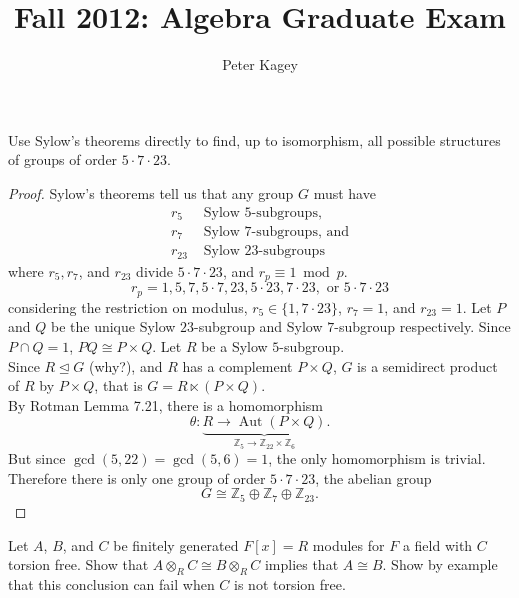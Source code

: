 \documentclass{article}
\newenvironment{problem}[2][Problem]{\begin{trivlist}
\item[\hskip \labelsep {\bfseries #1}\hskip \labelsep {\bfseries #2.}]}{\end{trivlist}}
\newcommand{\Z}{\mathbb Z}
\newcommand{\normalsubgroup}{\trianglelefteq}
\begin{document}
\title{Fall 2012: Algebra Graduate Exam}
\author{Peter Kagey}

\maketitle

\begin{problem}{1}
  Use Sylow's theorems directly to find, up to isomorphism, all possible structures of groups of order $5 \cdot 7 \cdot 23$.
\end{problem}

\begin{proof}
  Sylow's theorems tell us that any group $G$ must have \begin{align*}
    r_5 &\text{ Sylow } 5\text{-subgroups,} \\
    r_7 &\text{ Sylow } 7\text{-subgroups, and} \\
    r_{23} &\text{ Sylow } 23\text{-subgroups}
  \end{align*} where $r_5, r_7$, and $r_{23}$ divide $5 \cdot 7 \cdot 23$, and $r_p \equiv 1 \bmod p$. \[
    r_p = 1, 5, 7, 5 \cdot 7, 23, 5 \cdot 23, 7 \cdot 23, \text{ or } 5 \cdot 7 \cdot 23
  \] considering the restriction on modulus,
  $r_5 \in \{1, 7 \cdot 23\}$, $r_7 = 1$, and $r_{23} = 1$.
  Let $P$ and $Q$ be the unique Sylow $23$-subgroup and Sylow
  $7$-subgroup respectively.
  Since $P \cap Q = 1$, $PQ \cong P \times Q$. Let $R$ be a Sylow $5$-subgroup.
  \\
  Since $R \normalsubgroup G$ (why?), and $R$ has a complement $P \times Q$, $G$ is a
  semidirect product of $R$ by $P \times Q$, that is $G = R \ltimes (P \times Q)$.
  \\
  By Rotman Lemma 7.21, there is a homomorphism \[
    \theta\colon \underbrace{
      R \rightarrow \operatorname{Aut}(P \times Q)
    }_{\Z_5 \rightarrow \Z_{22} \times \Z_6}.
  \]
  But since $\gcd(5, 22) = \gcd(5, 6) = 1$, the only homomorphism is trivial.
  Therefore there is only one group of order $5 \cdot 7 \cdot 23$, the abelian
  group \[
    G \cong \Z_5 \oplus \Z_7 \oplus \Z_{23}.
  \]
\end{proof}
\pagebreak

\begin{problem}{2}
  Let $A$, $B$, and $C$ be finitely generated $F[x] = R$ modules for $F$ a field
  with $C$ torsion free. Show that $A \otimes_R C \cong B \otimes_R C$ implies
  that $A \cong B$.
  Show by example that this conclusion can fail when $C$ is not torsion free.
\end{problem}
\end{document}
